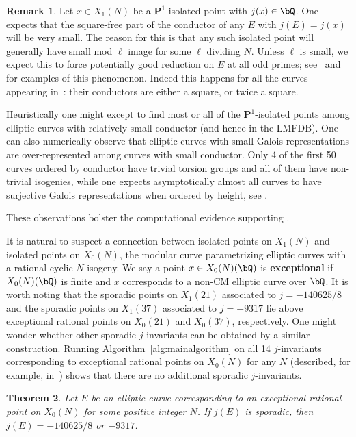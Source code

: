 \documentclass[11pt,reqno]{amsart}
\theoremstyle{plain}
\newtheorem{theorem}{Theorem}%
\theoremstyle{definition}
\newtheorem{remark}[theorem]{Remark}
\newcommand{\Q}{\bQ}
\newcommand{\PP}{\mathbf P}
\begin{document}
\begin{remark}
Let $x\in X_1(N)$ be a $\PP^1$-isolated point with $j(x) \in \Q$. One expects that the square-free part of the conductor of any $E$ with $j(E) = j(x)$ will be very small. The reason for this is that any such isolated point will generally have small mod $\ell$ image for some $\ell$ dividing $N$. Unless $\ell$ is small, we expect this to force potentially good reduction on $E$ at all odd primes; see~\cite[Corollary 4.4]{Mazur1978} and \cite[Theorem 5.1]{BiluParent11} for examples of this phenomenon. Indeed this happens for all the curves appearing in~: their conductors are either a square, or twice a square.

Heuristically one might except to find most or all of the $\PP^1$-isolated points among elliptic curves with relatively small conductor (and hence in the LMFDB). One can also numerically observe that elliptic curves with small Galois representations are over-represented among curves with small conductor. Only 4 of the first 50 curves ordered by conductor have trivial torsion groups and all of them have non-trivial isogenies, while one expects asymptotically almost all curves to have surjective Galois representations when ordered by height, see \cite[Theorem 1]{Duke97}.

These observations bolster the computational evidence supporting .
\end{remark}


It is natural to suspect a connection between isolated points on $X_1(N)$ and isolated points on $X_0(N)$, the modular curve parametrizing elliptic curves with a rational cyclic $N$-isogeny. We say a point $x \in X_0(N)(\Q)$ is \textbf{exceptional} if $X_0(N)(\Q)$ is finite and $x$ corresponds to a non-CM elliptic curve over $\Q$. It is worth noting that the sporadic points on $X_1(21)$ associated to $j=-140625/8$ and the sporadic points on $X_1(37)$ associated to $j=-9317$ lie above exceptional rational points on $X_0(21)$ and $X_0(37)$, respectively. One might wonder whether other sporadic $j$-invariants can be obtained by a similar construction. Running Algorithm~\ref{alg:mainalgorithm} on all 14 $j$-invariants corresponding to exceptional rational points on $X_0(N)$ for any $N$ (described, for example, in~\cite[Table 4]{LRAnn}) shows that there are no additional sporadic $j$-invariants. 

\begin{theorem}
Let $E$ be an elliptic curve corresponding to an exceptional rational point on $X_0(N)$ for some positive integer $N$. If $j(E)$ is sporadic, then $j(E)=-140625/8$ or $-9317$.
\end{theorem}
\end{document}

